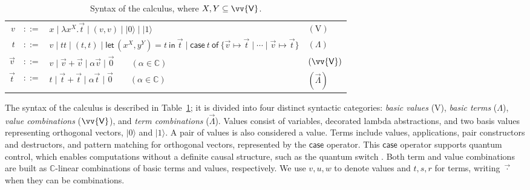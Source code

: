 \documentclass[a4paper,UKenglish,numberwithinsect,pdfa,anonymous]{lipics-v2021}
\theoremstyle{restatestyle}
\newcommand\ket[1]{\ensuremath{|#1\rangle}}
\newcommand\s[1]{\ensuremath{\mathsf{#1}}}
\newcommand\Val{{\s V}}
\DeclareRobustCommand{\ValD}{\ensuremath{\vv{\mathsf{V}}}}
\def\C{\mathbb{C}}            %
\def\Val{\mathrm{V}}          %
\def\Pair#1#2{(#1,#2)} %
\def\Lam#1#2#3{\lambda#1^{#2}{.}#3} %
\def\letkeyword{\mathsf{let}}
\def\inkeyword{\mathsf{in}}
\def\LetP#1#2#3#4#5#6{\letkeyword\,\Pair{#1^{#2}}{#3^{#4}}=#5~\inkeyword~#6}
\def\gencase#1#2#3#4#5{\ensuremath{\mathsf{case}~#1~\mathsf{of}~\{#2\mapsto #4 \mid \dotsb \mid #3\mapsto #5\}}}
\begin{document}
\begin{table}[t]
  \centering
  \begin{tabular}{rcll}
    $v$ & $::=$ & $x \mid \Lam{x}{X}{\vec{t}} \mid (v, v) \mid \ket{0} \mid \ket{1}$ & $(\Val)$ \\
    $t$ & $::=$ & $v \mid tt \mid (t,t) \mid \LetP{x}{X}{y}{Y}{t}{\vec{t}} \mid \gencase{t}{\vec{v}}{\vec{v}}{\vec{t}}{\vec{t}}$ & $(\Lambda)$ \\
    $\vec{v}$ & $::=$ & $v \mid \vec{v}+\vec{v} \mid \alpha \vec{v} \mid \vec 0 \qquad (\alpha\in\C)$ & $(\ValD)$ \\
    $\vec{t}$ & $::=$ & $t \mid \vec{t}+\vec{t} \mid \alpha \vec{t} \mid \vec 0 \qquad (\alpha\in\C)$ & $(\vec \Lambda)$
  \end{tabular}
  \caption{Syntax of the calculus, where $X, Y \subseteq \ValD$.}
  \label{tab:Syntax}
\end{table}
The syntax of the calculus is described in
Table~\ref{tab:Syntax}; it is divided into four
distinct syntactic categories: \emph{basic values} ($\Val$), \emph{basic terms}
($\Lambda$), \emph{value combinations} ($\ValD$), and \emph{term
combinations} ($\vec\Lambda$). Values consist of variables, decorated
lambda abstractions, and two basis values representing orthogonal vectors,
$\ket 0$ and $\ket 1$. A pair of values is also considered a value.  Terms
include values, applications, pair constructors and destructors, and pattern
matching for orthogonal vectors, represented by the $\mathsf{case}$ operator.
This $\mathsf{case}$ operator supports quantum control, which enables
computations without a definite causal structure, such as the quantum switch 
\cite{Chiribella_2013}.
Both term and value combinations are built as $\C$-linear combinations of
basic terms and values, respectively. We use $v,u,w$ to denote values and
$t,s,r$ for terms, writing $\vec{\cdot}$ when they can be combinations.
\end{document}
